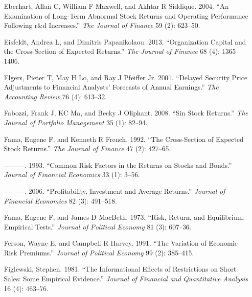 \documentclass[
  letterpaper,
  DIV=11,
  numbers=noendperiod]{scrreprt}
\newlength{\cslhangindent}
\newlength{\cslentryspacingunit} %
\newenvironment{CSLReferences}[2] %
 {%
  \setlength{\parindent}{0pt}
  \ifodd #1
  \let\oldpar\par
  \def\par{\hangindent=\cslhangindent\oldpar}
  \fi
  \setlength{\parskip}{#2\cslentryspacingunit}
 }%
 {}
\begin{document}
\begin{CSLReferences}{1}{0}
\leavevmode{}%
Eberhart, Allan C, William F Maxwell, and Akhtar R Siddique. 2004. {``An
Examination of Long-Term Abnormal Stock Returns and Operating
Performance Following r\&d Increases.''} \emph{The Journal of Finance}
59 (2): 623--50.

\leavevmode{}%
Eisfeldt, Andrea L, and Dimitris Papanikolaou. 2013. {``Organization
Capital and the Cross-Section of Expected Returns.''} \emph{The Journal
of Finance} 68 (4): 1365--1406.

\leavevmode{}%
Elgers, Pieter T, May H Lo, and Ray J Pfeiffer Jr. 2001. {``Delayed
Security Price Adjustments to Financial Analysts' Forecasts of Annual
Earnings.''} \emph{The Accounting Review} 76 (4): 613--32.

\leavevmode{}%
Fabozzi, Frank J, KC Ma, and Becky J Oliphant. 2008. {``Sin Stock
Returns.''} \emph{The Journal of Portfolio Management} 35 (1): 82--94.

\leavevmode{}%
Fama, Eugene F, and Kenneth R French. 1992. {``The Cross-Section of
Expected Stock Returns.''} \emph{The Journal of Finance} 47 (2):
427--65.

\leavevmode{}%
---------. 1993. {``Common Risk Factors in the Returns on Stocks and
Bonds.''} \emph{Journal of Financial Economics} 33 (1): 3--56.

\leavevmode{}%
---------. 2006. {``Profitability, Investment and Average Returns.''}
\emph{Journal of Financial Economics} 82 (3): 491--518.

\leavevmode{}%
Fama, Eugene F, and James D MacBeth. 1973. {``Risk, Return, and
Equilibrium: Empirical Tests.''} \emph{Journal of Political Economy} 81
(3): 607--36.

\leavevmode{}%
Ferson, Wayne E, and Campbell R Harvey. 1991. {``The Variation of
Economic Risk Premiums.''} \emph{Journal of Political Economy} 99 (2):
385--415.

\leavevmode{}%
Figlewski, Stephen. 1981. {``The Informational Effects of Restrictions
on Short Sales: Some Empirical Evidence.''} \emph{Journal of Financial
and Quantitative Analysis} 16 (4): 463--76.


\end{CSLReferences}
\end{document}
